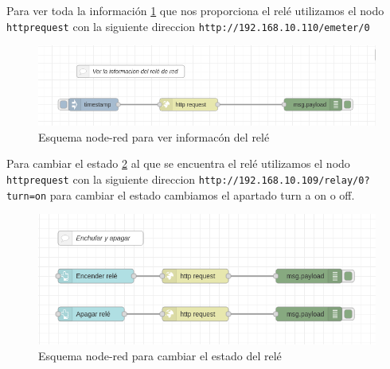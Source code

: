 \documentclass[11pt, letterpaper]{article}
\begin{document}
Para ver toda la información \ref{fig:Ver_informacion_rele} que nos proporciona el relé utilizamos el nodo \texttt{httprequest} con la siguiente direccion \texttt{http://192.168.10.110/emeter/0}


\begin{figure}[h]
	\centering
	\includegraphics[width=\textwidth]{Ver_informacion_rele.png}
	\caption{Esquema node-red para ver informacón del relé} 
	\label{fig:Ver_informacion_rele}
\end{figure}

Para cambiar el estado \ref{fig:Cambiar_estado_rele} al que se encuentra el relé utilizamos el nodo \texttt{httprequest} con la siguiente direccion \texttt{http://192.168.10.109/relay/0?turn=on}
para cambiar el estado cambiamos el apartado turn a on o off.

\begin{figure}[h]
	\centering
	\includegraphics[width=\textwidth]{enchufar_apagar_rele.png}
	\caption{Esquema node-red para cambiar el estado del relé} 
	\label{fig:Cambiar_estado_rele}
\end{figure}
\end{document}
